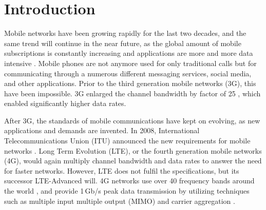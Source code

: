 \section{Introduction}
\label{sec:introduction}

\thispagestyle{empty}

\begin{comment}
\begin{itemize}
\item[--]Tutkimuksen taustaa ja tutkimusaiheen yleisluonteinen esittely
\item[--]Tutkimuksen tavoitteet
\item[--]Pääkysymys ja osaongelmat
\item[--]Tutkimuksen rajaus ja keskeiset käsitteet.
\item[--]Työn rakenne
\end{itemize}
\end{comment}

Mobile networks have been growing rapidly for the last two decades, and the same trend will continue in the near future, as the global amount of mobile subscriptions is constantly increasing and applications are more and more data intensive \cite{nokia,cisco,ericsson,gsma}. Mobile phones are not anymore used for only traditional calls but for communicating through a numerous different messaging services, social media, and other applications. Prior to the third generation mobile networks (3G), this have been impossible. 3G enlarged the channel bandwidth by factor of 25 \cite{molisch}, which enabled significantly higher data rates.

After 3G, the standards of mobile communications have kept on evolving, as new applications and demands are invented. In 2008, International Telecommunications Union (ITU) announced the new requirements for mobile networks \cite{itur}. Long Term Evolution (LTE), or the fourth generation mobile networks (4G), would again multiply channel bandwidth and data rates to answer the need for faster networks. However, LTE does not fulfil the specifications, but its successor LTE-Advanced will. 4G networks use over 40 frequency bands around the world \cite{radio_electronics,molisch}, and provide 1\,Gb/s peak data transmission by utilizing techniques such as multiple input multiple output (MIMO) and carrier aggregation \cite{parkvall_lte}.

